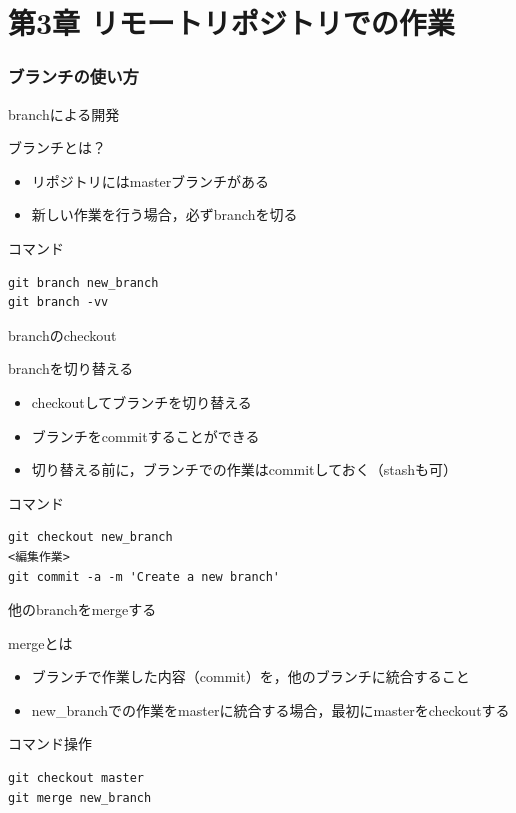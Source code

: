\documentclass[t, aspectratio=169]{beamer}
\begin{document}
\part{第3章 リモートリポジトリでの作業}
\label{sec-3}
\section{ブランチの使い方}
\label{sec-3-1}
\begin{frame}[fragile,label=sec-3-1-1]{branchによる開発}
 \begin{block}{ブランチとは？}
\begin{itemize}
\item リポジトリにはmasterブランチがある
\item 新しい作業を行う場合，必ずbranchを切る
\end{itemize}
\end{block}
\begin{block}{コマンド}
\begin{verbatim}
git branch new_branch
git branch -vv
\end{verbatim}
\end{block}
\end{frame}

\begin{frame}[fragile,label=sec-3-1-2]{branchのcheckout}
 \begin{block}{branchを切り替える}
\begin{itemize}
\item checkoutしてブランチを切り替える
\item ブランチをcommitすることができる
\item 切り替える前に，ブランチでの作業はcommitしておく（stashも可）
\end{itemize}
\end{block}
\begin{block}{コマンド}
\begin{verbatim}
git checkout new_branch
<編集作業>
git commit -a -m 'Create a new branch'
\end{verbatim}
\end{block}
\end{frame}

\begin{frame}[fragile,label=sec-3-1-3]{他のbranchをmergeする}
 \begin{block}{mergeとは}
\begin{itemize}
\item ブランチで作業した内容（commit）を，他のブランチに統合すること
\item new\_branchでの作業をmasterに統合する場合，最初にmasterをcheckoutする
\end{itemize}
\end{block}
\begin{block}{コマンド操作}
\begin{verbatim}
git checkout master
git merge new_branch
\end{verbatim}
\end{block}
\end{frame}
\end{document}
